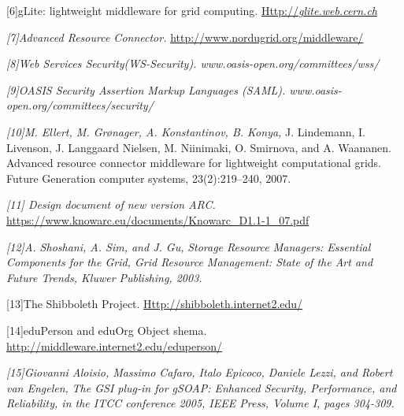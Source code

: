 \documentclass{article}
\newcommand\textstyleCitation[1]{\textit{#1}}
\begin{document}
[6]gLite: lightweight middleware for grid computing.
\href{http://glite.web.cern.ch/}{Http://}\href{http://glite.web.cern.ch/}{\textstyleCitation{\textup{glite.web.cern.ch}}}

\textstyleCitation{\textup{[7]Advanced Resource Connector.
}}\url{http://www.nordugrid.org/middleware/}

\textstyleCitation{\textup{[8]Web Services Security(WS-Security).
www.oasis-open.org/committees/wss/}}

\textstyleCitation{\textup{[9]OASIS Security Assertion Markup Languages
(SAML). www.oasis-open.org/committees/security/}}

\textstyleCitation{\textup{[10]}}\textstyleCitation{\textup{M. Ellert,
M. Gr{\o}nager, A. Konstantinov, B. Konya, }}J. Lindemann, I. Livenson,
J. Langgaard Nielsen, M. Niinimaki, O. Smirnova, and A. Waananen.
Advanced resource connector middleware for lightweight computational
grids. Future Generation computer systems, 23(2):219--240, 2007.

\textstyleCitation{\textup{[11] Design document of new version ARC.
}}\url{https://www.knowarc.eu/documents/Knowarc_D1.1-1_07.pdf}

\textstyleCitation{\textup{[12]A. Shoshani, A. Sim, and J. Gu,
}}\textstyleCitation{Storage Resource Managers: Essential Components
for the Grid}\textstyleCitation{\textup{, Grid Resource Management:
State of the Art and Future Trends, Kluwer Publishing, 2003.}}

[13]The Shibboleth Project.
\href{http://shibboleth.internet2.edu/}{Http://shibboleth.internet2.edu/}

[14]eduPerson and eduOrg Object shema.
\url{http://middleware.internet2.edu/eduperson/}

\textstyleCitation{\textup{[15]}}\textstyleCitation{\textup{Giovanni
Aloisio, Massimo Cafaro, Italo Epicoco, Daniele Lezzi, and Robert van
Engelen, }}\textstyleCitation{The GSI plug-in for gSOAP: Enhanced
Security, Performance, and Reliability}\textstyleCitation{\textup{, in
the ITCC conference 2005, IEEE Press, Volume I, pages 304-309.}}


\bigskip


\bigskip


\bigskip
\end{document}
